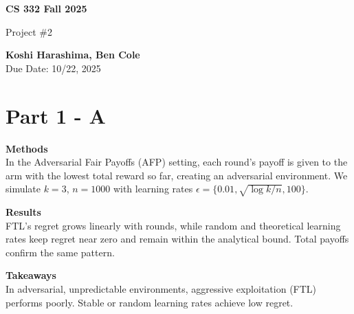 \documentclass[10pt]{article}
\renewenvironment{shaded}{%
  \def\FrameCommand{\fboxsep=\FrameSep \colorbox{shadecolor}}%
  \MakeFramed{\advance\hsize-\width \FrameRestore\FrameRestore}}%
 {\endMakeFramed}
\begin{document}
\graphicspath{{../figures/}{figures/}{332Project2/figures/}}

\begin{titlepage}
   \begin{center}
       \vspace*{9cm}

       \textbf{CS 332 Fall 2025}

       \vspace{0.5cm}
        Project \#2
        \vfill

       \textbf{Koshi Harashima, Ben Cole}\\
       Due Date: 10/22, 2025
            
   \end{center}
\end{titlepage}

\pagebreak


\section{Part 1 - A}
\begin{shaded}
\textbf{Methods}\\
In the Adversarial Fair Payoffs (AFP) setting, each round’s payoff is given to the arm with the lowest total reward so far, creating an adversarial environment.  
We simulate $k=3$, $n=1000$ with learning rates $\epsilon=\{0.01, \sqrt{\log k/n}, 100\}$.

\textbf{Results}\\
FTL’s regret grows linearly with rounds, while random and theoretical learning rates keep regret near zero and remain within the analytical bound.  
Total payoffs confirm the same pattern.

\textbf{Takeaways}\\
In adversarial, unpredictable environments, aggressive exploitation (FTL) performs poorly.  
Stable or random learning rates achieve low regret.
\end{shaded}
\end{document}
